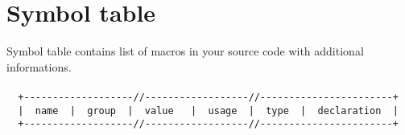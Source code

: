         \section{Symbol table}
            Symbol table contains list of macros in your source code with additional informations.
            {
                ~\\
                \usecodefont\\
                \verb'  +-------------------//------------------//-----------------------+'\\
                \verb'  |  name  |  group  |  value   |  usage  |  type  |  declaration  |'\\
                \verb'  +-------------------//------------------//-----------------------+'\\
            }\\
